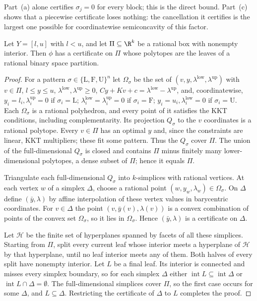 Part~(a) alone certifies $\sigma_j=0$ for every block; this is the direct
bound. Part~(c) shows that a piecewise certificate loses nothing: the
cancellation it certifies is the largest one possible for coordinatewise
semiconcavity of this factor.

\begin{proposition}\label{prop:cert-exist}
Let $Y=[l,u]$ with $l<u$, and let $\Pi\subseteq\R^k$ be a rational box with
nonempty interior. Then $\phi$ has a certificate on $\Pi$ whose polytopes are
the leaves of a rational binary space partition.
\end{proposition}

\begin{proof}
For a pattern $\sigma\in\{\mathrm L,\mathrm F,\mathrm U\}^n$ let $\Omega_\sigma$
be the set of $(v,y,\lambda^{\mathrm{low}},\lambda^{\mathrm{up}})$ with $v\in\Pi$,
$l\le y\le u$, $\lambda^{\mathrm{low}},\lambda^{\mathrm{up}}\ge0$,
$Cy+Kv+c=\lambda^{\mathrm{low}}-\lambda^{\mathrm{up}}$, and, coordinatewise,
$y_i=l_i,\lambda^{\mathrm{up}}_i=0$ if $\sigma_i=\mathrm L$;
$\lambda^{\mathrm{low}}_i=\lambda^{\mathrm{up}}_i=0$ if $\sigma_i=\mathrm F$;
$y_i=u_i,\lambda^{\mathrm{low}}_i=0$ if $\sigma_i=\mathrm U$. Each $\Omega_\sigma$
is a rational polyhedron, and every point of it satisfies the KKT conditions,
including complementarity. Its projection $Q_\sigma$ to the $v$ coordinates
is a rational polytope. Every $v\in\Pi$ has an optimal $y$ and, since the
constraints are linear, KKT multipliers; these fit some pattern. Thus the
$Q_\sigma$ cover $\Pi$. The union of the full-dimensional $Q_\sigma$ is closed
and contains $\Pi$ minus finitely many lower-dimensional polytopes, a dense
subset of $\Pi$; hence it equals $\Pi$.

Triangulate each full-dimensional $Q_\sigma$ into $k$-simplices with rational
vertices. At each vertex $w$ of a simplex $\Delta$, choose a rational point
$(w,y_w,\lambda_w)\in\Omega_\sigma$. On $\Delta$ define $(\bar y,\lambda)$ by
affine interpolation of these vertex values in barycentric coordinates. For
$v\in\Delta$ the point $(v,\bar y(v),\lambda(v))$ is a convex combination of
points of the convex set $\Omega_\sigma$, so it lies in $\Omega_\sigma$. Hence
$(\bar y,\lambda)$ is a certificate on $\Delta$.

Let $\mathcal H$ be the finite set of hyperplanes spanned by facets of all
these simplices. Starting from $\Pi$, split every current leaf whose interior
meets a hyperplane of $\mathcal H$ by that hyperplane, until no leaf interior
meets any of them. Both halves of every split have nonempty interior. Let $L$
be a final leaf. Its interior is connected and misses every simplex boundary,
so for each simplex $\Delta$ either $\operatorname{int}L\subseteq\operatorname{int}\Delta$
or $\operatorname{int}L\cap\Delta=\emptyset$. The full-dimensional simplices
cover $\Pi$, so the first case occurs for some $\Delta$, and $L\subseteq\Delta$.
Restricting the certificate of $\Delta$ to $L$ completes the proof.
\end{proof}

